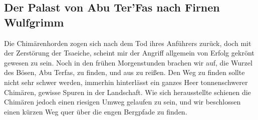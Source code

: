 \subsection{Der Palast von Abu Ter'Fas nach Firnen Wulfgrimm}

Die Chimärenhorden zogen sich nach dem Tod ihres Anführers zurück, doch mit der Zerstörung der Tsaeiche, scheint mir der Angriff allgemein von Erfolg gekrönt gewesen zu sein. Noch in den frühen Morgenstunden brachen wir auf, die Wurzel des Bösen, Abu Terfas, zu finden, und aus zu reißen. Den Weg zu finden sollte nicht sehr schwer werden, immerhin hinterlässt ein ganzes Heer tonnenschwerer Chimären, gewisse Spuren in der Landschaft.
Wie sich herausstellte schienen die Chimären jedoch einen riesigen Umweg gelaufen zu sein, und wir beschlossen einen kürzen Weg quer über die engen Bergpfade zu finden.

